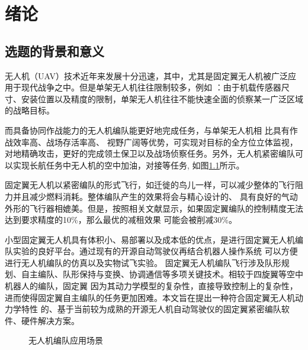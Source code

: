 %
%
%
%

\chapter{绪论}
\label{chap:intro}
\section{选题的背景和意义}
无人机（UAV）技术近年来发展十分迅速，其中，尤其是固定翼无人机被广泛应用于现代战争之中。但是单架无人机往往限制较多，例如
：由于机载传感器尺寸、安装位置以及精度的限制，单架无人机往往不能快速全面的侦察某一广泛区域的战略目标。

而具备协同作战能力的无人机编队能更好地完成任务，与单架无人机相 比具有作战效率高、战场存活率高、
视野广阔等优势，可实现对目标的全方位立体监视，对地精确攻击，更好的完成领土保卫以及战场侦察任务。另外，无人机紧密编队可
以实现长航任务中无人机的空中加油，对接等任务, 如图\ref{fig:c01-meaning}所示。

固定翼无人机以紧密编队的形式飞行，如迁徙的鸟儿一样，可以减少整体的飞行阻力并且减少燃料消耗。整体编队产生的效果将会与精心设计的、
具有良好的气动外形的飞行器相媲美。但是，按照相关文献显示，如果固定翼编队的控制精度无法达到要求精度的10\%，那么最优的减租效果
可能会被削减30\%。\cite{Zhang2017Aerodynamics}

小型固定翼无人机具有体积小、易部署以及成本低的优点，是进行固定翼无人机编队实验的良好平台。通过现有的开源自动驾驶仪再结合机器人操作系统
可以方便进行无人机编队的仿真以及实物试飞实验。
固定翼无人机编队飞行涉及队形规划、自主编队、队形保持与变换、协调通信等多项关键技术。相较于四旋翼等空中机器人的编队，固定翼
因为其动力学模型的复杂性，直接导致控制上的复杂性，进而使得固定翼自主编队的任务更加困难。本文旨在提出一种符合固定翼无人机动力学特性
的、基于当前较为成熟的开源无人机自动驾驶仪的固定翼紧密编队软件、硬件解决方案。
 \begin{figure}[H]
  \centering
  \caption{无人机编队应用场景}
  \label{fig:c01-meaning}
  \end{figure}
